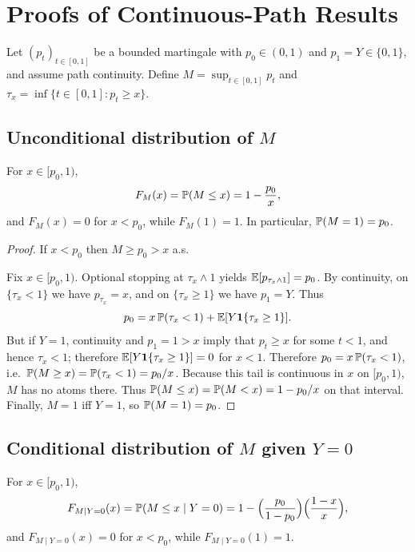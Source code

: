 \section{Proofs of Continuous-Path Results} \label{app:continuous-proofs}

Let $(p_t)_{t\in[0,1]}$ be a bounded martingale with $p_0\in(0,1)$ and $p_1=Y\in\{0,1\}$, and assume path continuity.
Define $M=\sup_{t\in[0,1]}p_t$ and $\tau_x=\inf\{t\in[0,1]: p_t\ge x\}$.

\subsection{Unconditional distribution of \texorpdfstring{$M$}{M}}

\begin{theorem} \label{thm:supp-continuous-unconditional}
For $x\in[p_0,1)$,
\[
F_M(x)=\P(M\le x)=1-\frac{p_0}{x},
\]
and $F_M(x)=0$ for $x<p_0$, while $F_M(1)=1$.
In particular, $\P(M=1)=p_0$.
\end{theorem}

\begin{proof}
If $x<p_0$ then $M\ge p_0>x$ a.s.

Fix $x\in[p_0,1)$. Optional stopping at $\tau_x\wedge 1$ yields $\E[p_{\tau_x\wedge 1}]=p_0$.
By continuity, on $\{\tau_x<1\}$ we have $p_{\tau_x}=x$, and on $\{\tau_x\ge 1\}$ we have $p_1=Y$.
Thus
\[
p_0 = x\,\P(\tau_x<1) + \E[Y\mathbf 1\{\tau_x\ge 1\}].
\]
But if $Y=1$, continuity and $p_1=1>x$ imply that $p_t\ge x$ for some $t<1$, and hence $\tau_x<1$; therefore
$\E[Y\mathbf 1\{\tau_x\ge 1\}]=0$ for $x<1$.
Therefore $p_0 = x\,\P(\tau_x<1)$, i.e.\ $\P(M\ge x)=\P(\tau_x<1)=p_0/x$.
Because this tail is continuous in $x$ on $[p_0,1)$, $M$ has no atoms there.
Thus $\P(M\le x)=\P(M<x)=1-p_0/x$ on that interval.
Finally, $M=1$ iff $Y=1$, so $\P(M=1)=p_0$.
\end{proof}

\subsection{Conditional distribution of \texorpdfstring{$M$ given $Y=0$}{M given Y=0}}

\begin{theorem} \label{thm:supp-continuous-conditional}
For $x\in[p_0,1)$,
\[
F_{M\mid Y=0}(x)=\P(M\le x\mid Y=0)
=
1-\Big(\frac{p_0}{1-p_0}\Big)\Big(\frac{1-x}{x}\Big),
\]
and $F_{M\mid Y=0}(x)=0$ for $x<p_0$, while $F_{M\mid Y=0}(1)=1$.
\end{theorem}

